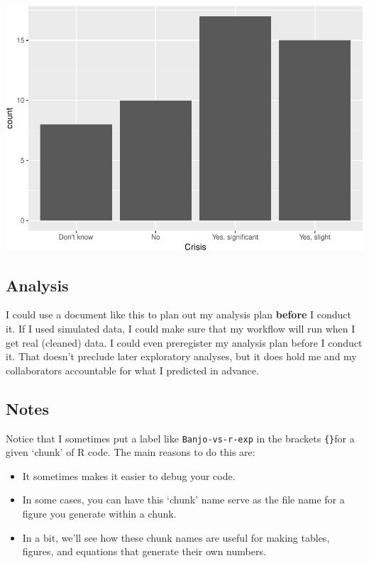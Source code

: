 \documentclass[]{article}
\providecommand{\tightlist}{%
  \setlength{\itemsep}{0pt}\setlength{\parskip}{0pt}}
\begin{document}
\includegraphics{bootcamp-survey_files/figure-latex/Crisis-1.pdf}

\subsection{Analysis}\label{analysis}

I could use a document like this to plan out my analysis plan
\textbf{before} I conduct it. If I used simulated data, I could make
sure that my workflow will run when I get real (cleaned) data. I could
even preregister my analysis plan before I conduct it. That doesn't
preclude later exploratory analyses, but it does hold me and my
collaborators accountable for what I predicted in advance.

\subsection{Notes}\label{notes}

Notice that I sometimes put a label like \texttt{Banjo-vs-r-exp} in the
brackets \texttt{\{\}}for a given `chunk' of R code. The main reasons to
do this are:

\begin{itemize}
\tightlist
\item
  It sometimes makes it easier to debug your code.
\item
  In some cases, you can have this `chunk' name serve as the file name
  for a figure you generate within a chunk.
\item
  In a bit, we'll see how these chunk names are useful for making
  tables, figures, and equations that generate their own numbers.
\end{itemize}
\end{document}
